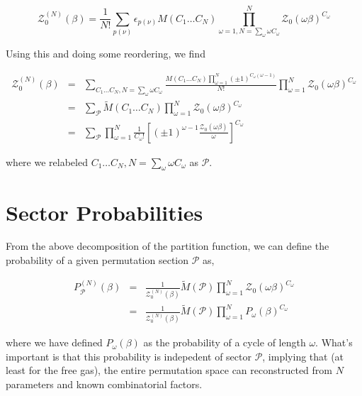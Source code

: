 \documentclass[aps,preprint,showpacs,superscriptaddress,groupedaddress]{revtex4}  %
\begin{document}
\begin{equation}
  \mathcal{Z}_{0}^{(N)}(\beta) = \frac{1}{N!} \sum_{p(\nu)} \epsilon_{p(\nu)} M(C_{1} \dots C_{N}) \prod_{\omega=1, N=\sum_{\omega}\omega C_{\omega}}^{N} \mathcal{Z}_{0}(\omega\beta)^{C_{\omega}}
\end{equation}

Using this and doing some reordering, we find

\begin{eqnarray}
  \mathcal{Z}_{0}^{(N)}(\beta) &=& \sum_{C_{1} \dots C_{N}, N=\sum_{\omega}\omega C_{\omega}} \frac{M(C_{1} \dots C_{N}) \prod_{\omega=1}^{N} (\pm 1)^{C_{\omega}(\omega-1)}}{N!} \prod_{\omega=1}^{N} \mathcal{Z}_{0}(\omega\beta)^{C_{\omega}} \\
                               &=& \sum_{\mathcal{P}} \tilde{M}(C_{1} \dots C_{N}) \prod_{\omega=1}^{N} \mathcal{Z}_{0}(\omega\beta)^{C_{\omega}} \\
                               &=& \sum_{\mathcal{P}} \prod_{\omega=1}^{N} \frac{1}{C_{\omega}!} [(\pm 1)^{\omega-1} \frac{\mathcal{Z}_{0}(\omega\beta)}{\omega}]^{C_{\omega}}
\end{eqnarray}

where we relabeled $C_{1} \dots C_{N}, N=\sum_{\omega}\omega C_{\omega}$ as $\mathcal{P}$.


\section{Sector Probabilities}

From the above decomposition of the partition function, we can define the probability of a given permutation section $\mathcal{P}$ as,

\begin{eqnarray}
  P_{\mathcal{P}}^{(N)}(\beta) &=& \frac{1}{\mathcal{Z}_{0}^{(N)}(\beta)} \tilde{M}(\mathcal{P}) \prod_{\omega=1}^{N} \mathcal{Z}_{0}(\omega\beta)^{C_{\omega}} \\
                               &=& \frac{1}{\mathcal{Z}_{0}^{(N)}(\beta)} \tilde{M}(\mathcal{P}) \prod_{\omega=1}^{N} P_{\omega}(\beta)^{C_{\omega}}
\end{eqnarray}

where we have defined $P_{\omega}(\beta)$ as the probability of a cycle of length $\omega$. What's important is that this probability is indepedent of sector $\mathcal{P}$, implying that (at least for the free gas), the entire permutation space can reconstructed from $N$ parameters and known combinatorial factors.
\end{document}
